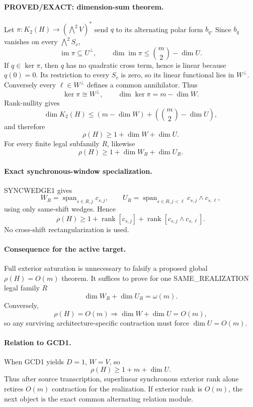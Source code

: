\documentclass[11pt]{article}
\begin{document}
\paragraph{PROVED/EXACT: dimension-sum theorem.}
Let \(\pi:K_2(H)\to(\bigwedge^2V)^*\) send \(q\) to its alternating polar form \(b_q\). Since \(b_q\) vanishes on every \(\bigwedge^2S_v\),
\[
\operatorname{im}\pi\subseteq U^\perp,\qquad
\dim\operatorname{im}\pi\le\binom m2-\dim U.
\]
If \(q\in\ker\pi\), then \(q\) has no quadratic cross term, hence is linear because \(q(0)=0\). Its restriction to every \(S_v\) is zero, so its linear functional lies in \(W^\perp\). Conversely every \(\ell\in W^\perp\) defines a common annihilator. Thus
\[
\ker\pi\cong W^\perp,\qquad \dim\ker\pi=m-\dim W.
\]
Rank-nullity gives
\[
\dim K_2(H)\le(m-\dim W)+\left(\binom m2-\dim U\right),
\]
and therefore
\[
\boxed{\rho(H)\ge1+\dim W+\dim U.}
\]
For every finite legal subfamily \(R\), likewise
\[
\boxed{\rho(H)\ge1+\dim W_R+\dim U_R.}
\]

\paragraph{Exact synchronous-window specialization.}
SYNCWEDGE1 gives
\[
W_R=\operatorname{span}_{s\in R,j}c_{s,j},\qquad
U_R=\operatorname{span}_{s\in R,j<\ell}c_{s,j}\wedge c_{s,\ell},
\]
using only same-shift wedges. Hence
\[
\boxed{\rho(H)\ge1+\operatorname{rank}[c_{s,j}]+\operatorname{rank}[c_{s,j}\wedge c_{s,\ell}].}
\]
No cross-shift rectangularization is used.

\paragraph{Consequence for the active target.}
Full exterior saturation is unnecessary to falsify a proposed global \(\rho(H)=O(m)\) theorem. It suffices to prove for one SAME\_REALIZATION legal family \(R\)
\[
\boxed{\dim W_R+\dim U_R=\omega(m).}
\]
Conversely,
\[
\boxed{\rho(H)=O(m)\Longrightarrow\dim W+\dim U=O(m),}
\]
so any surviving architecture-specific contraction must force \(\dim U=O(m)\).

\paragraph{Relation to GCD1.}
When GCD1 yields \(D=1\), \(W=V\), so
\[
\boxed{\rho(H)\ge1+m+\dim U.}
\]
Thus after source transcription, superlinear synchronous exterior rank alone retires \(O(m)\) contraction for the realization. If exterior rank is \(O(m)\), the next object is the exact common alternating relation module.
\end{document}
